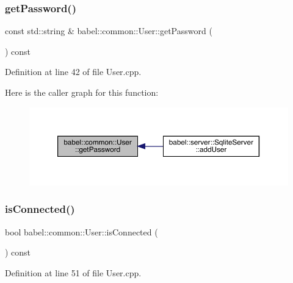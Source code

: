 \subsubsection{\texorpdfstring{get\+Password()}{getPassword()}}
{\footnotesize\ttfamily const std\+::string \& babel\+::common\+::\+User\+::get\+Password (\begin{DoxyParamCaption}{ }\end{DoxyParamCaption}) const}



Definition at line 42 of file User.\+cpp.

Here is the caller graph for this function\+:\nopagebreak
\begin{figure}[H]
\begin{center}
\leavevmode
\includegraphics[width=350pt]{classbabel_1_1common_1_1_user_a2b5c6ca06f0a664ba93ae3d4f473a887_icgraph}
\end{center}
\end{figure}
\mbox{\label{classbabel_1_1common_1_1_user_a8af22580dc334973ac39cc74aed7c946}} 
\subsubsection{\texorpdfstring{is\+Connected()}{isConnected()}}
{\footnotesize\ttfamily bool babel\+::common\+::\+User\+::is\+Connected (\begin{DoxyParamCaption}{ }\end{DoxyParamCaption}) const}



Definition at line 51 of file User.\+cpp.

\mbox{\label{classbabel_1_1common_1_1_user_a966aa4761080c430f3028d61bbc91230}} 
